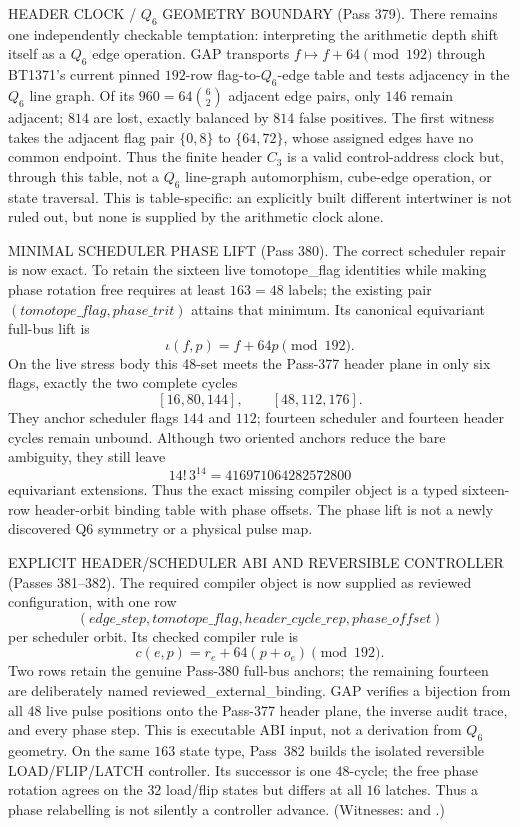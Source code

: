 \documentclass[12pt,a4paper]{article}
\def\textbf#1{#1}%
\def\texttt#1{#1}%
\def\cdot{ }%
\theoremstyle{definition}
\begin{document}
\begin{center}
{{\smallskip
\textbf{HEADER CLOCK / \(Q_6\) GEOMETRY BOUNDARY (Pass 379).}  There remains
one independently checkable temptation: interpreting the arithmetic depth
shift itself as a $Q_6$ edge operation.  GAP transports
$f\mapsto f+64\pmod {192}$ through BT1371's current pinned $192$-row
flag-to-$Q_6$-edge table and tests adjacency in the $Q_6$ line graph.  Of its
$960=64\binom{6}{2}$ adjacent edge pairs, only $146$ remain adjacent; $814$ are
lost, exactly balanced by $814$ false positives.  The first witness takes the
adjacent flag pair $\{0,8\}$ to $\{64,72\}$, whose assigned edges have no
common endpoint.  Thus the finite header $C_3$ is a valid control-address
clock but, through this table, not a $Q_6$ line-graph automorphism, cube-edge
operation, or state traversal.  This is table-specific: an explicitly built
different intertwiner is not ruled out, but none is supplied by the arithmetic
clock alone.

\smallskip
\textbf{MINIMAL SCHEDULER PHASE LIFT (Pass 380).}  The correct scheduler
repair is now exact.  To retain the sixteen live \texttt{tomotope\_flag}
identities while making phase rotation free requires at least
$16\cdot3=48$ labels; the existing pair
$(\texttt{tomotope\_flag},\texttt{phase\_trit})$ attains that minimum.  Its
canonical equivariant full-bus lift is
\[
  \iota(f,p)=f+64p\pmod {192}.
\]
On the live stress body this 48-set meets the Pass-377 header plane in only
six flags, exactly the two complete cycles
\[
  [16,80,144],\qquad [48,112,176].
\]
They anchor scheduler flags $144$ and $112$; fourteen scheduler and fourteen
header cycles remain unbound.  Although two oriented anchors reduce the bare
ambiguity, they still leave
\[
  14!\,3^{14}=416971064282572800
\]
equivariant extensions.  Thus the exact missing compiler object is a typed
sixteen-row header-orbit binding table with phase offsets.  The phase lift is
not a newly discovered Q6 symmetry or a physical pulse map.

\smallskip
\textbf{EXPLICIT HEADER/SCHEDULER ABI AND REVERSIBLE CONTROLLER (Passes
381--382).}  The required compiler object is now supplied as reviewed
configuration, with one row
\[
(\texttt{edge\_step},\texttt{tomotope\_flag},
  \texttt{header\_cycle\_rep},\texttt{phase\_offset})
\]
per scheduler orbit.  Its checked compiler rule is
\[
 c(e,p)=r_e+64(p+o_e)\pmod {192}.
\]
Two rows retain the genuine Pass-380 full-bus anchors; the remaining fourteen
are deliberately named \texttt{reviewed\_external\_binding}.  GAP verifies a
bijection from all $48$ live pulse positions onto the Pass-377 header plane,
the inverse audit trace, and every phase step.  This is executable ABI input,
not a derivation from $Q_6$ geometry.  On the same $16\cdot3$ state type,
Pass~382 builds the isolated reversible
\texttt{LOAD/FLIP/LATCH} controller.  Its successor is one $48$-cycle; the
free phase rotation agrees on the $32$ load/flip states but differs at all
$16$ latches.  Thus a phase relabelling is not silently a controller advance.
(Witnesses:
 and
.)

}}
\end{center}
\end{document}
